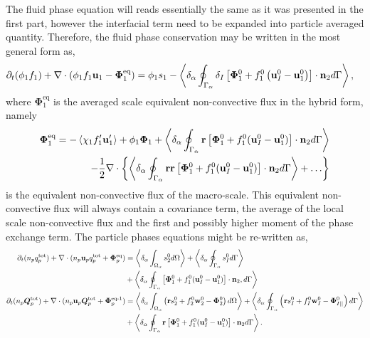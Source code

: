 The fluid phase equation will reads essentially the same as it was presented in the first part, however the interfacial term need to be expanded into particle averaged quantity. 
Therefore, the fluid phase conservation may be written in the most general form as, 
\begin{align}
    \partial_t (\phi_1 f_1)
    +\mathbf{\nabla}\cdot (\phi_1 f_1 \textbf{u}_1  - \bm\Phi_1^\text{eq})
    &= 
    \phi_1 s_1
    - \left<\delta_\alpha \oint_{\Gamma_\alpha} \delta_I\left[
        \bm{\Phi}_1^0
        + f_1^0
        \left(
            \textbf{u}_I^0
            - \textbf{u}_1^0
        \right)
    \right]
    \cdot \textbf{n}_2 d\Gamma\right> ,
    \label{eq:dt_f_1_hybrid}
\end{align}
where $\bm\Phi_1^\text{eq}$ is the averaged scale equivalent non-convective flux in the hybrid form, namely 
\begin{align}
    \bm\Phi_1^\text{eq}
    = 
    - \left<\chi_1 f_1' \textbf{u}_1'\right>
    + \phi_1 \bm\Phi_1
    + \left<\delta_\alpha \oint_{\Gamma_\alpha} \textbf{r} \left[
        \bm{\Phi}_1^0
        + f_1^0 (\textbf{u}_I^0-\textbf{u}_1^0)
    \right]\cdot \textbf{n}_2 d\Gamma\right>\\
    - \frac{1}{2}\mathbf{\nabla}\cdot\left\{
        \left<\delta_\alpha \oint_{\Gamma_\alpha} \textbf{rr} \left[
            \bm{\Phi}_1^0
            + f_1^0 (\textbf{u}_I^0-\textbf{u}_1^0)
            \right]\cdot \textbf{n}_2 d\Gamma\right>
            +\ldots
        \right\}
\end{align}
is the equivalent non-convective flux of the macro-scale. 
This equivalent non-convective flux will always contain a covariance term, the average of the local scale non-convective flux and the first and possibly higher moment of the phase exchange term. 
The particle phases equations might be re-written as, 
\begin{align}
    \label{eq:dt_q_p_hybrid}
    \partial_t (n_p  q_p^\text{tot})
    + \mathbf{\nabla}\cdot (n_p\textbf{u}_p q_p^\text{tot} + \bm\Phi_p^\text{eq})
    &= \left<\delta_\alpha \int_{\Omega_\alpha}  s_2^0  d\Omega\right>
    + \left<\delta_\alpha \oint_{\Gamma_\alpha}  s_I^0  d\Gamma\right>\\
    &+ \left<\delta_\alpha \oint_{\Gamma_\alpha}  \left[\bm{\Phi}_1^0 + f_1^0 (\textbf{u}_I^0-\textbf{u}_1^0) \right] \cdot \textbf{n}_2 , d\Gamma\right>
    \\
    \label{eq:dt_Q_p_hybrid}
    \partial_t (n_p  \bm{Q}_p^\text{tot})
    + \mathbf{\nabla}\cdot (n_p \textbf{u}_p\bm{Q}_p^\text{tot}
    + \bm\Phi_p^\text{eq-1})
    &=\left<\delta_\alpha \int_{\Omega_\alpha}  \left(
        \textbf{r} s_2^0         
        + f_2^0  \textbf{w}_2^0 
        - \bm{\Phi}_2^0
    \right)  d\Omega\right>
    + \left<\delta_\alpha \oint_{\Gamma_\alpha}  \left(
        \textbf{r}s_I^0
        + f_I^0 \textbf{w}_I^0
        - \bm{\Phi}_{I||}^0
    \right)  d\Gamma\right>\nonumber\\
    &+ \left<\delta_\alpha \oint_{\Gamma_\alpha}  \textbf{r} \left[
        \bm{\Phi}_1^0
        + f_1^0 (\textbf{u}_I^0-\textbf{u}_1^0)
    \right]\cdot \textbf{n}_2   d\Gamma\right>.
\end{align}
